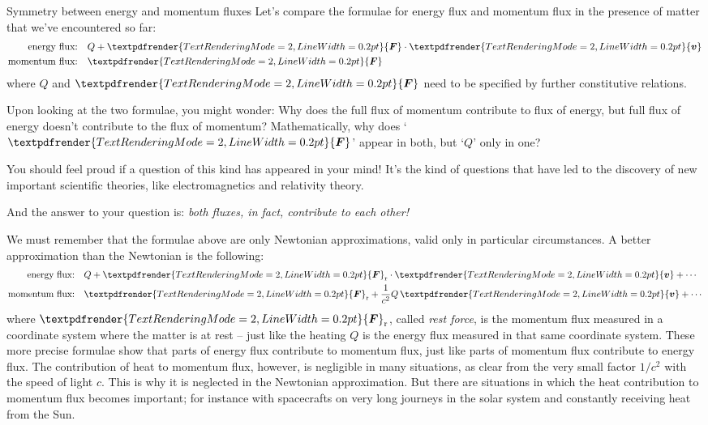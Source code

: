 \documentclass[a4paper,12pt,%
onecolumn,oneside,%
british%
]{memoir}
\renewcommand*{\bm}[1]{\textpdfrender{TextRenderingMode=2,LineWidth=0.2pt}{\boldsymbol{#1}}}
\renewcommand*{\|}[1][]{\nonscript\:#1\vert\nonscript\:\mathopen{}}
\newcommand*{\yc}{c} %
\newcommand*{\yv}{\bm{v}}
\newcommand*{\yQ}{Q}%
\newcommand*{\yF}{\bm{F}}
\newcommand*{\yFo}{\yF_{\textrm{r}}}
\begin{document}
\begin{extra}{Symmetry between energy and momentum fluxes}
  Let's compare the formulae for energy flux and momentum flux in the presence of matter that we've encountered so far:
  \begin{equation*}
    \begin{aligned}
      \text{energy flux:}&\quad \yQ + \yF\cdot\yv
      \\
      \text{momentum flux:}&\quad \yF
    \end{aligned}
  \end{equation*}
  where $\yQ$ and $\yF$ need to be specified by further constitutive relations.

    \smallskip

    Upon looking at the two formulae, you might wonder: Why does the full flux of momentum contribute to flux of energy, but full flux of energy doesn't contribute to the flux of momentum? Mathematically, why does \enquote*{$\yF$} appear in both, but \enquote*{$\yQ$} only in one?

    \smallskip

    You should feel proud if a question of this kind has appeared in your mind! It's the kind of questions that have led to the discovery of new important scientific theories, like electromagnetics and relativity theory.

    \smallskip

    And the answer to your question is: \emph{both fluxes, in fact, contribute to each other!}

    \smallskip

    We must remember that the formulae above are only Newtonian approximations, valid only in particular circumstances. A better approximation than the Newtonian is the following:
  \begin{equation*}
    \begin{aligned}
      \text{energy flux:}&\quad \yQ + \yFo\cdot\yv + \dotsb
      \\
      \text{momentum flux:}&\quad \yFo + \frac{1}{\yc^2}\yQ\, \yv + \dotsb
    \end{aligned}
  \end{equation*}
  where $\yFo$, called \emph{rest force}, is the momentum flux measured in a coordinate system where the matter is at rest -- just like the heating $\yQ$ is the energy flux measured in that same coordinate system. These more precise formulae show that parts of energy flux contribute to momentum flux, just like parts of momentum flux contribute to energy flux. The contribution of heat to momentum flux, however, is negligible in many situations, as clear from the very small factor $1/\yc^{2}$ with the speed of light $\yc$. This is why it is neglected in the Newtonian approximation. But there are situations in which the heat contribution to momentum flux becomes important; for instance with spacecrafts on very long journeys in the solar system and constantly receiving heat from the Sun.


\end{extra}
\end{document}
